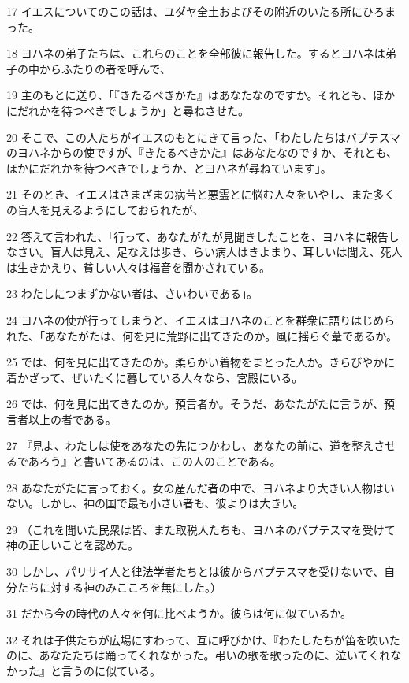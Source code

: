 \par 17 イエスについてのこの話は、ユダヤ全土およびその附近のいたる所にひろまった。
\par 18 ヨハネの弟子たちは、これらのことを全部彼に報告した。するとヨハネは弟子の中からふたりの者を呼んで、
\par 19 主のもとに送り、「『きたるべきかた』はあなたなのですか。それとも、ほかにだれかを待つべきでしょうか」と尋ねさせた。
\par 20 そこで、この人たちがイエスのもとにきて言った、「わたしたちはバプテスマのヨハネからの使ですが、『きたるべきかた』はあなたなのですか、それとも、ほかにだれかを待つべきでしょうか、とヨハネが尋ねています」。
\par 21 そのとき、イエスはさまざまの病苦と悪霊とに悩む人々をいやし、また多くの盲人を見えるようにしておられたが、
\par 22 答えて言われた、「行って、あなたがたが見聞きしたことを、ヨハネに報告しなさい。盲人は見え、足なえは歩き、らい病人はきよまり、耳しいは聞え、死人は生きかえり、貧しい人々は福音を聞かされている。
\par 23 わたしにつまずかない者は、さいわいである」。
\par 24 ヨハネの使が行ってしまうと、イエスはヨハネのことを群衆に語りはじめられた、「あなたがたは、何を見に荒野に出てきたのか。風に揺らぐ葦であるか。
\par 25 では、何を見に出てきたのか。柔らかい着物をまとった人か。きらびやかに着かざって、ぜいたくに暮している人々なら、宮殿にいる。
\par 26 では、何を見に出てきたのか。預言者か。そうだ、あなたがたに言うが、預言者以上の者である。
\par 27 『見よ、わたしは使をあなたの先につかわし、あなたの前に、道を整えさせるであろう』と書いてあるのは、この人のことである。
\par 28 あなたがたに言っておく。女の産んだ者の中で、ヨハネより大きい人物はいない。しかし、神の国で最も小さい者も、彼よりは大きい。
\par 29 （これを聞いた民衆は皆、また取税人たちも、ヨハネのバプテスマを受けて神の正しいことを認めた。
\par 30 しかし、パリサイ人と律法学者たちとは彼からバプテスマを受けないで、自分たちに対する神のみこころを無にした。）
\par 31 だから今の時代の人々を何に比べようか。彼らは何に似ているか。
\par 32 それは子供たちが広場にすわって、互に呼びかけ、『わたしたちが笛を吹いたのに、あなたたちは踊ってくれなかった。弔いの歌を歌ったのに、泣いてくれなかった』と言うのに似ている。
